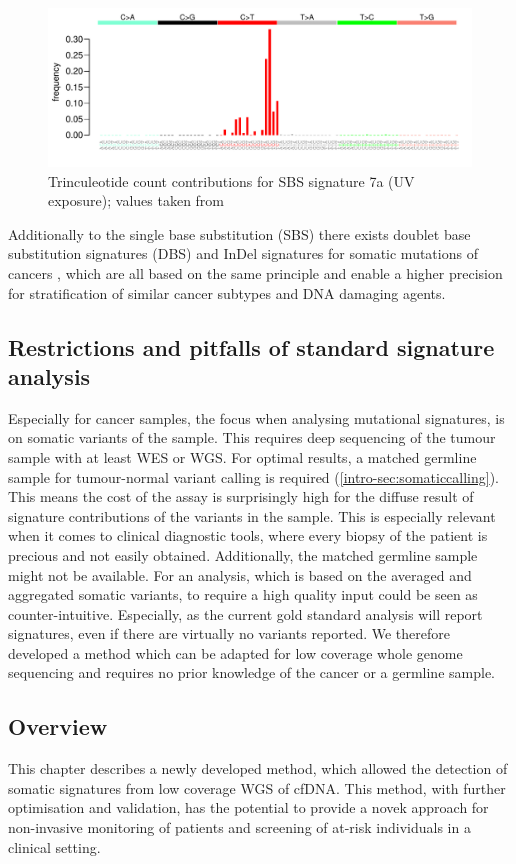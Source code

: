 \begin{figure}[!ht]
\centering
\includegraphics[width=.99\linewidth]{Figures/MisMatchFinder/SBS7aSignature.pdf}
\caption[Trinculeotide count contributions for single base substitution (SBS) signature 7a]{Trinculeotide count contributions for SBS signature 7a (UV exposure); values taken from \protect\textcite{Alexandrov2020}}\label{fig:sig7a}
\end{figure}

Additionally to the single base substitution (SBS) there exists doublet base substitution signatures (DBS) and InDel signatures for somatic mutations of cancers \cite{Alexandrov2020}, which are all based on the same principle and enable a higher precision for stratification of similar cancer subtypes and DNA damaging agents.

\subsection{Restrictions and pitfalls of standard signature analysis}
Especially for cancer samples, the focus when analysing mutational signatures, is on somatic variants of the sample. This requires deep sequencing of the tumour sample with at least WES or WGS. For optimal results, a  matched germline sample for tumour-normal variant calling is required (\autoref{intro-sec:somaticcalling}). This means the cost of the assay is surprisingly high for the diffuse result of signature contributions of the variants in the sample. This is especially relevant when it comes to clinical diagnostic tools, where every biopsy of the patient is precious and not easily obtained. Additionally, the matched germline sample might not be available. For an analysis, which is based on the averaged and aggregated somatic variants, to require a high quality input could be seen as counter-intuitive. Especially, as the current gold standard analysis will report signatures, even if there are virtually no variants reported. We therefore developed a method which can be adapted for low coverage whole genome sequencing and requires no prior knowledge of the cancer or a germline sample.

\subsection{Overview}
 This chapter describes a newly developed method, which allowed the detection of somatic signatures from low coverage WGS of cfDNA. This method, with further optimisation and validation, has the potential to provide a novek approach for non-invasive monitoring of patients and  screening of at-risk individuals in a clinical setting.
